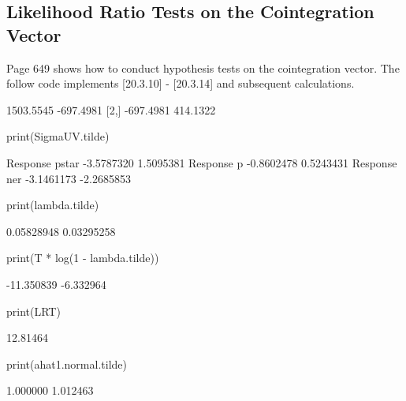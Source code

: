 \documentclass[a4paper]{article}
\renewcommand{\~}{\perispomeni}%
\begin{document}
\subsection{Likelihood Ratio Tests on the Cointegration Vector}
Page 649 shows how to conduct hypothesis tests on the cointegration vector.  The follow code implements
[20.3.10] - [20.3.14] and subsequent calculations.
\begin{Schunk}
\begin{Soutput}
          [,1]      [,2]
[1,] 1503.5545 -697.4981
[2,] -697.4981  414.1322
\end{Soutput}
\begin{Sinput}
 print(SigmaUV.tilde)
\end{Sinput}
\begin{Soutput}
                     [,1]       [,2]
Response pstar -3.5787320  1.5095381
Response p     -0.8602478  0.5243431
Response ner   -3.1461173 -2.2685853
\end{Soutput}
\begin{Sinput}
 print(lambda.tilde)
\end{Sinput}
\begin{Soutput}
[1] 0.05828948 0.03295258
\end{Soutput}
\begin{Sinput}
 print(T * log(1 - lambda.tilde))
\end{Sinput}
\begin{Soutput}
[1] -11.350839  -6.332964
\end{Soutput}
\begin{Sinput}
 print(LRT)
\end{Sinput}
\begin{Soutput}
[1] 12.81464
\end{Soutput}
\begin{Sinput}
 print(ahat1.normal.tilde)
\end{Sinput}
\begin{Soutput}
[1] 1.000000 1.012463
\end{Soutput}
\end{Schunk}
\end{document}
